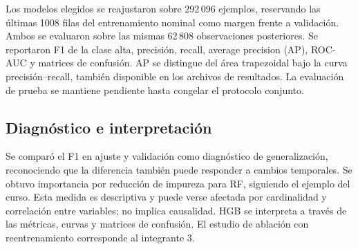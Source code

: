 Los modelos elegidos se reajustaron sobre 292\,096 ejemplos, reservando las últimas 1008 filas del entrenamiento nominal como margen frente a validación. Ambos se evaluaron sobre las mismas 62\,808 observaciones posteriores. Se reportaron F1 de la clase alta, precisión, recall, average precision (AP), ROC-AUC y matrices de confusión. AP se distingue del área trapezoidal bajo la curva precisión--recall, también disponible en los archivos de resultados. La evaluación de prueba se mantiene pendiente hasta congelar el protocolo conjunto.

\subsection{Diagnóstico e interpretación}
Se comparó el F1 en ajuste y validación como diagnóstico de generalización, reconociendo que la diferencia también puede responder a cambios temporales. Se obtuvo importancia por reducción de impureza para RF, siguiendo el ejemplo del curso. Esta medida es descriptiva y puede verse afectada por cardinalidad y correlación entre variables; no implica causalidad. HGB se interpreta a través de las métricas, curvas y matrices de confusión. El estudio de ablación con reentrenamiento corresponde al integrante 3.

